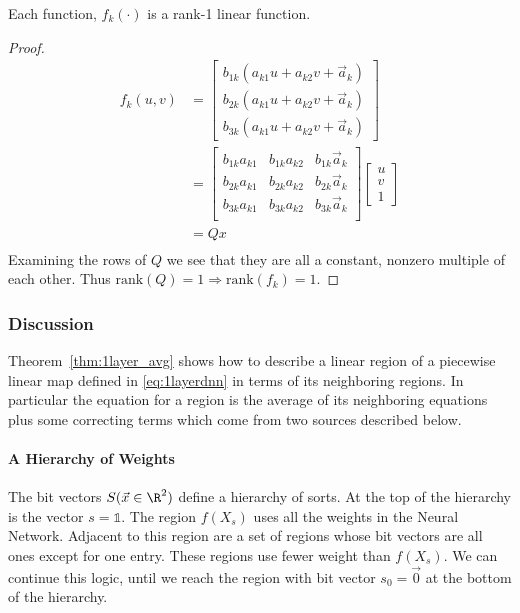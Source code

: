 \begin{remark}
Each function, $f_k(\cdot)$ is a rank-1 linear function.
\end{remark}
\begin{proof}
\begin{align*}
    f_k(u, v) &= \begin{bmatrix}b_{1k}(a_{k1}u + a_{k2}v + \vec{a}_k) \\
                                b_{2k}(a_{k1}u + a_{k2}v + \vec{a}_k) \\
                                b_{3k}(a_{k1}u + a_{k2}v + \vec{a}_k) \end{bmatrix} \\
              &= \begin{bmatrix}b_{1k}a_{k1} & b_{1k} a_{k2} & b_{1k} \vec{a}_k \\
                                b_{2k}a_{k1} & b_{2k} a_{k2} & b_{2k} \vec{a}_k \\
                                b_{3k}a_{k1} & b_{3k} a_{k2} & b_{3k} \vec{a}_k \\ \end{bmatrix} 
                                \begin{bmatrix}u \\ v \\ 1 \end{bmatrix} \\
              &= Qx\\
\end{align*}
Examining the rows of $Q$ we see that they are all a constant, nonzero multiple of each other. Thus $\text{rank}(Q) = 1 \Rightarrow \text{rank}(f_k) = 1$.
\end{proof}

\subsubsection{Discussion}
Theorem~\ref{thm:1layer_avg} shows how to describe a linear region of a piecewise linear map defined in \ref{eq:1layerdnn} in terms of its neighboring regions. In particular the equation for a region is the average of its neighboring equations plus some correcting terms which come from two sources described below.

\paragraph{A Hierarchy of Weights} The bit vectors $S(\vec{x} \in \R^2)$ define a hierarchy of sorts. At the top of the hierarchy is the vector $s = \mathbb{1}$. The region $f(X_s)$ uses all the weights in the Neural Network. Adjacent to this region are a set of regions whose bit vectors are all ones except for one entry. These regions use fewer weight than $f(X_s)$. We can continue this logic, until we reach the region with bit vector $s_0 = \vec{0}$ at the bottom of the hierarchy.


